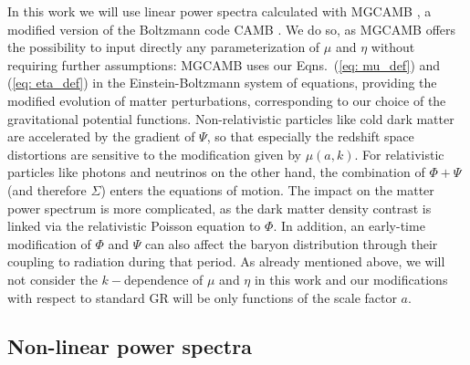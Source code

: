 In this work we will use linear power spectra calculated with MGCAMB
\cite{zhao_searching_2009,hojjati_testing_2011}, a modified version
of the Boltzmann code CAMB \cite{lewis_efficient_2000}. We do so,
as MGCAMB offers the possibility to input directly any parameterization
of $\mu$ and $\eta$ without requiring further assumptions:
MGCAMB uses our Eqns.\ (\ref{eq: mu_def}) and (\ref{eq: eta_def}) in the Einstein-Boltzmann
system of equations, providing the modified evolution of matter perturbations,
corresponding to our choice of the gravitational potential functions.
Non-relativistic particles like cold dark matter are accelerated by the
gradient of $\Psi$, so that especially the redshift space distortions are
sensitive to the modification given by $\mu(a,k)$. For relativistic particles
like photons and neutrinos on the other hand, the combination of $\Phi+\Psi$ (and therefore $\Sigma$)
enters the equations of motion. The impact on the matter power spectrum
is more complicated, as the dark matter density contrast is linked via
the relativistic Poisson equation to $\Phi$. In addition, an early-time
modification of $\Phi$ and $\Psi$ can also affect the baryon distribution through
their coupling to radiation during that period.
As already mentioned above, we will not consider
the $k-$dependence of $\mu$ and $\eta$ in this work and our modifications
with respect to standard GR will be only functions of the scale factor
$a$.


\subsection{Non-linear power spectra \label{sub:MG-nonlinear-spectra}}

\done{}

